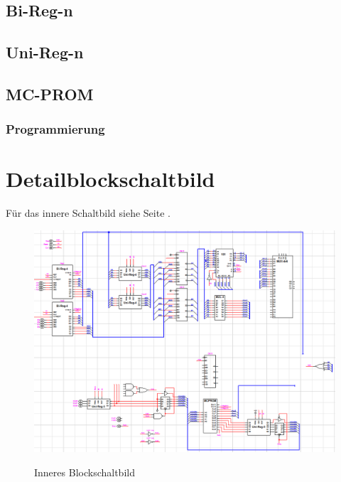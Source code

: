 \documentclass[11pt]{report}
\begin{document}
	\subsection{Bi-Reg-n}
	\subsection{Uni-Reg-n}
	\subsection{MC-PROM}
	\subsubsection{Programmierung}
	
	\section{Detailblockschaltbild}
	Für das innere Schaltbild siehe Seite \pageref{inneresBlockschaltbild}.
	\begin{figure}[htbp]
		\begin{center}
			\includegraphics[width=\textwidth]{inneresBlockschaltbild}
			\label{inneresBlockschaltbild}
			\caption{Inneres Blockschaltbild}
		\end{center}
	\end{figure}
	
\end{document}
